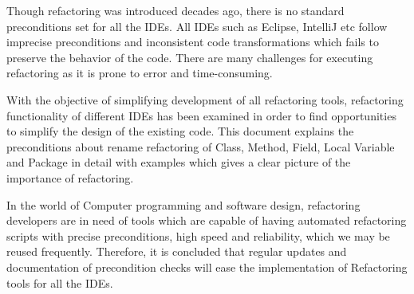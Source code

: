 \documentclass[10pt,conference]{IEEEtran}
\begin{document}
Though refactoring was introduced decades ago, there is no standard preconditions set for all the IDEs. All IDEs such as Eclipse, IntelliJ etc follow imprecise preconditions and inconsistent code transformations which fails to preserve the behavior of the code. There are many challenges for executing refactoring as it is prone to error and time-consuming. 

With the objective of simplifying development of all refactoring tools, refactoring functionality of different IDEs has been examined in order to find opportunities to simplify the design of the existing code. This document explains the preconditions about rename refactoring of Class, Method, Field, Local Variable and Package in detail with examples which gives a clear picture of the importance of refactoring. 

In the world of Computer programming and software design, refactoring developers are in need of tools which are capable of having automated refactoring scripts with precise preconditions, high speed and reliability, which we may be reused frequently. Therefore, it is concluded that regular updates and documentation of precondition checks will ease the implementation of Refactoring tools for all the IDEs.



\end{document}
